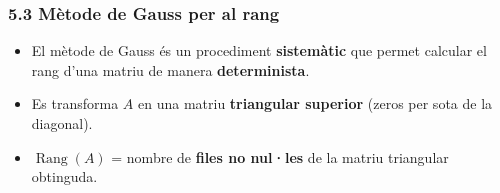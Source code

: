 \documentclass[aspectratio=169]{beamer}
\begin{document}
\begin{frame}[t]
  \frametitle{5.3 Mètode de Gauss per al rang}

  \vspace{-0.28cm}
  \begin{itemize}
    \item<1-> El mètode de Gauss és un procediment \textbf{sistemàtic} que permet calcular el rang d'una matriu de manera \textbf{determinista}.
    \item<2-> Es transforma $A$ en una matriu \textbf{triangular superior} (zeros per sota de la diagonal).
    \item<3-> $\operatorname{Rang}(A)$ = nombre de \textbf{files no nul·les} de la matriu triangular obtinguda.
  \end{itemize}

  \vspace{0.06cm}
\end{frame}
\end{document}
